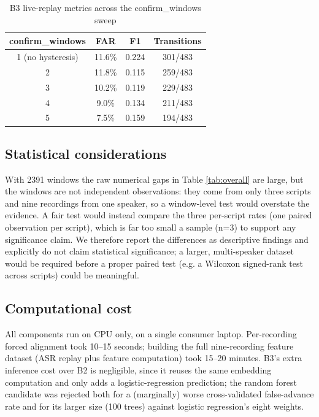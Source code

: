 \documentclass[conference,a4paper]{IEEEtran}
\begin{document}
\begin{table}[htbp]
\caption{B3 live-replay metrics across the confirm\_windows sweep}
\begin{center}
\begin{tabular}{|c|c|c|c|}
\hline
\textbf{confirm\_windows} & \textbf{FAR} & \textbf{F1} & \textbf{Transitions} \\
\hline
1 (no hysteresis) & 11.6\% & 0.224 & 301/483 \\
\hline
2 & 11.8\% & 0.115 & 259/483 \\
\hline
3 & 10.2\% & 0.119 & 229/483 \\
\hline
4 & 9.0\% & 0.134 & 211/483 \\
\hline
5 & 7.5\% & 0.159 & 194/483 \\
\hline
\end{tabular}
\label{tab:confirm}
\end{center}
\end{table}

\subsection{Statistical considerations}
With 2391 windows the raw numerical gaps in Table \ref{tab:overall} are large, but the windows are not independent observations: they come from only three scripts and nine recordings from one speaker, so a window-level test would overstate the evidence. A fair test would instead compare the three per-script rates (one paired observation per script), which is far too small a sample (n=3) to support any significance claim. We therefore report the differences as descriptive findings and explicitly do not claim statistical significance; a larger, multi-speaker dataset would be required before a proper paired test (e.g. a Wilcoxon signed-rank test across scripts) could be meaningful.

\subsection{Computational cost}
All components run on CPU only, on a single consumer laptop. Per-recording forced alignment took 10--15 seconds; building the full nine-recording feature dataset (ASR replay plus feature computation) took 15--20 minutes. B3's extra inference cost over B2 is negligible, since it reuses the same embedding computation and only adds a logistic-regression prediction; the random forest candidate was rejected both for a (marginally) worse cross-validated false-advance rate and for its larger size (100 trees) against logistic regression's eight weights.
\end{document}
